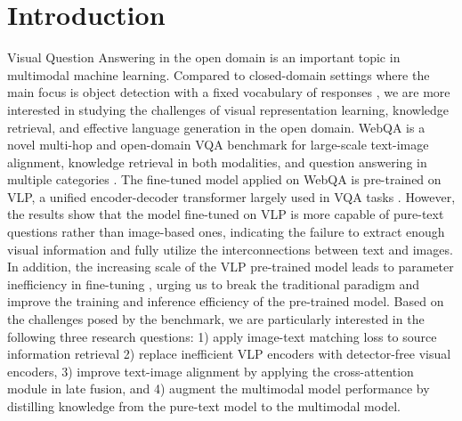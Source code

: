 \documentclass[nohyperref]{article}
\theoremstyle{plain}
\theoremstyle{definition}
\theoremstyle{remark}
\begin{document}
\section{Introduction}\label{intro}

Visual Question Answering in the open domain is an important topic in multimodal machine learning. Compared to closed-domain settings where the main focus is object detection with a fixed vocabulary of responses \citep{closed-domain}, we are more interested in studying the challenges of visual representation learning, knowledge retrieval, and effective language generation in the open domain. WebQA is a novel multi-hop and open-domain VQA benchmark for large-scale text-image alignment, knowledge retrieval in both modalities, and question answering in multiple categories \citep{webqa}. The fine-tuned model applied on WebQA is pre-trained on VLP, a unified encoder-decoder transformer largely used in VQA tasks \citep{vlp}. However, the results show that the model fine-tuned on VLP is more capable of pure-text questions rather than image-based ones, indicating the failure to extract enough visual information and fully utilize the interconnections between text and images. In addition, the increasing scale of the VLP pre-trained model leads to parameter inefficiency in fine-tuning \citep{vlp-survey}, urging us to break the traditional paradigm and improve the training and inference efficiency of  the pre-trained model. Based on the challenges posed by the benchmark, we are particularly interested in the following three research questions: 1) apply image-text matching loss to source information retrieval 2) replace inefficient VLP encoders with detector-free visual encoders, 3) improve text-image alignment by applying the cross-attention module in late fusion, and 4) augment the multimodal model performance by distilling knowledge from the pure-text model to the multimodal model.
\end{document}
